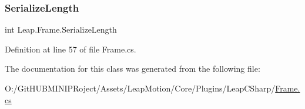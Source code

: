 \subsubsection{\texorpdfstring{SerializeLength}{SerializeLength}}
{\footnotesize\ttfamily int Leap.\+Frame.\+Serialize\+Length\hspace{0.3cm}{\ttfamily [get]}}



Definition at line 57 of file Frame.\+cs.



The documentation for this class was generated from the following file\+:\begin{DoxyCompactItemize}
\item 
O\+:/\+Git\+H\+U\+B\+M\+I\+N\+I\+P\+Roject/\+Assets/\+Leap\+Motion/\+Core/\+Plugins/\+Leap\+C\+Sharp/\mbox{\hyperlink{_frame_8cs}{Frame.\+cs}}\end{DoxyCompactItemize}
